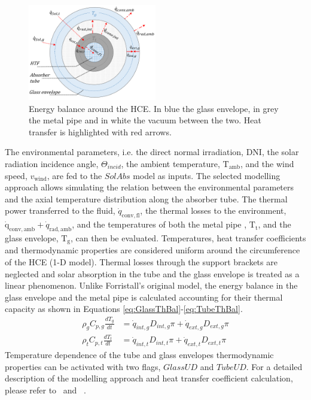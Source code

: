 \documentclass[final,3p,times,review]{elsarticle}
\begin{document}
\begin{figure}[h!]
	\centering
	\includegraphics[width=0.5\textwidth]{Figures/Forristal_cs2.pdf}
	\caption{Energy balance around the HCE. In blue the glass envelope, in grey the metal pipe and in white the vacuum between the two. Heat transfer is highlighted with red arrows.}
	\label{fig:Forristal_cs2}
\end{figure}
%
The environmental parameters, i.e. the direct normal irradiation, DNI, the solar radiation incidence angle, $\Theta_{incid}$, the ambient temperature, $\mathrm{T}_\mathrm{amb}$, and the wind speed, $v_\mathrm{wind}$, are fed to the $SolAbs$ model as inputs. The selected modelling approach allows simulating the relation between the environmental parameters and the axial temperature distribution along the absorber tube. The thermal power transferred to the fluid, $\dot{q}_\mathrm{conv,fl}$, the thermal losses to the environment, $\mathrm{\dot{q}}_\mathrm{conv,amb} + \dot{q}_\mathrm{rad,amb}$, and the temperatures of both the metal pipe , $\mathrm{T}_\mathrm{t}$, and the glass envelope, $\mathrm{T}_\mathrm{g}$, can then be evaluated. Temperatures, heat transfer coefficients and thermodynamic properties are considered uniform around the circumference of the HCE (1-D model). Thermal losses through the support brackets are neglected and  solar absorption in the tube and the glass envelope is treated as a linear phenomenon. Unlike Forristall's original model, the energy balance in the glass envelope and the metal pipe is calculated  accounting for their thermal capacity as shown in Equations \ref{eq:GlassThBal}-\ref{eq:TubeThBal}.
\begin{align}
\label{eq:GlassThBal}
\rho_g C_{p,g} \frac{d T_g}{dt} & = \dot{q}_{int,g} D_{int,g} \pi + \dot{q}_{ext,g} D_{ext,g} \pi \\
\label{eq:TubeThBal}
\rho_t C_{p,t} \frac{d T_t}{dt} & = \dot{q}_{int,t} D_{int,t} \pi + \dot{q}_{ext,t} D_{ext,t} \pi
\end{align}
Temperature dependence of the tube and glass envelopes thermodynamic properties can be activated with two flags, $GlassUD$ and $TubeUD$. For a detailed description of the modelling approach and heat transfer coefficient calculation, please refer to~\cite{Forristall2003} and ~\cite{Desideri2016}. 
\end{document}
